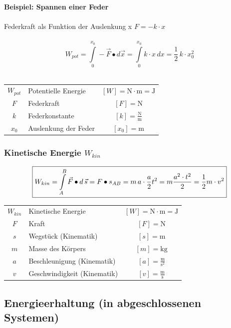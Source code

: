 			\textbf{Beispiel: Spannen einer Feder} \\
				\\  
				Federkraft als Funktion der Auslenkung x \qquad $F = -k \cdot x$ \\
				\\
				$$ \boxed{ W_{pot} = \int \limits_0^{x_0}  - \vec{F} \bullet d \vec{x} = \int \limits_0^{x_0}  k \cdot x \, dx = \frac{1}{2} \, k \cdot x_0^2} $$ \\
				
			\begin{tabular}{c l c}
				$W_{pot}$ & Potentielle Energie & $[W] = \mathrm{N \cdot m = J}$ \\
				$F$ & Federkraft & $[F] = \mathrm{N} $ \\
				$k$ & Federkonstante & $[k] = \mathrm{\frac{N}{m}}$ \\
				$x_0$ & Auslenkung der Feder & $[x_0] = \mathrm{m}$ \\
			\end{tabular}

		\subsubsection{Kinetische Energie $W_{kin}$}
		
			$$ \boxed{ \normalsize{ W_{kin} = \int \limits_A^B \vec{F} \bullet d \, \vec{s} =  F \bullet s_{AB} = m \, a \cdot \frac{a}{2} t^2 = m \frac{a^2 \cdot t^2}{2} = \frac{1}{2} m \cdot v^2} }$$
			
			\begin{tabular}{c l c}
				$W_{kin}$ & Kinetische Energie & $[W] = \mathrm{N \cdot m = J}$ \\
				$F$ & Kraft & $[F] = \mathrm{N} $ \\
				$s$ & Wegstück (Kinematik) & $[s] = \mathrm{m}$ \\
				$m$ & Masse des Körpers & $[m] = \mathrm{kg}$ \\
				$a$ & Beschleunigung (Kinematik) & $[a] = \mathrm{\frac{m}{s^2}}$ \\
				$v$ & Geschwindigkeit (Kinematik) & $[v] = \mathrm{\frac{m}{s}}$ \\
			\end{tabular}

	\subsection{Energieerhaltung (in abgeschlossenen Systemen)}
	
